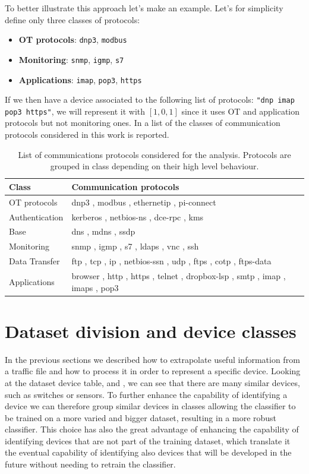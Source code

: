 To better illustrate this approach let's make an example. Let's for simplicity define only three classes of protocols:
\begin{itemize}[ nolistsep]
    \item \textbf{OT protocols}: \texttt{dnp3}, \texttt{modbus}
    \item \textbf{Monitoring}: \texttt{snmp}, \texttt{igmp}, \texttt{s7}
    \item \textbf{Applications}: \texttt{imap}, \texttt{pop3}, \texttt{https}
\end{itemize}
If we then have a device associated to the following list of protocols: \texttt{"dnp imap pop3 https"}, we will represent it with $[1,0,1]$ since it uses OT and application protocols but not monitoring ones.
In  a list of the classes of communication protocols considered in this work is reported.

\bigskip

\begin{table}[h]
\centering
\begin{tabular}{|l|l|}
\hline
\textbf{Class} & \textbf{Communication protocols} \\
\hline
OT protocols   &  dnp3 ,  modbus ,  ethernetip ,   pi-connect \\
Authentication & kerberos ,  netbios-ns ,  dce-rpc ,  kms \\
Base           & dns ,  mdns ,  ssdp \\
Monitoring     & snmp ,  igmp ,  s7 ,  ldaps ,  vnc ,  ssh \\
Data Transfer  & ftp ,  tcp ,  ip ,  netbios-ssn ,  udp ,  ftps ,  cotp ,   ftps-data \\
Applications   & browser ,  http ,  https ,  telnet ,    dropbox-lsp ,  smtp ,  imap ,  imaps ,  pop3  \\
\hline
\end{tabular}
\caption{List of communications protocols considered for the analysis. Protocols are grouped in class depending on their high level behaviour.}
\label{tab:protolist}
\end{table}

\section{Dataset division and device classes}

In the previous sections we described how to extrapolate useful information from a traffic file and how to process it in order to represent a specific device. Looking at the dataset device table,  and , we can see that there are many similar devices, such as switches or sensors. 
To further enhance the capability of identifying a device we can therefore group similar devices in classes allowing the classifier to be trained on a more varied and bigger dataset, resulting in a more robust classifier. This choice has also the great advantage of enhancing the capability of identifying devices that are not part of the training dataset, which translate it the eventual capability of identifying also devices that will be developed in the future without needing to retrain the classifier.



